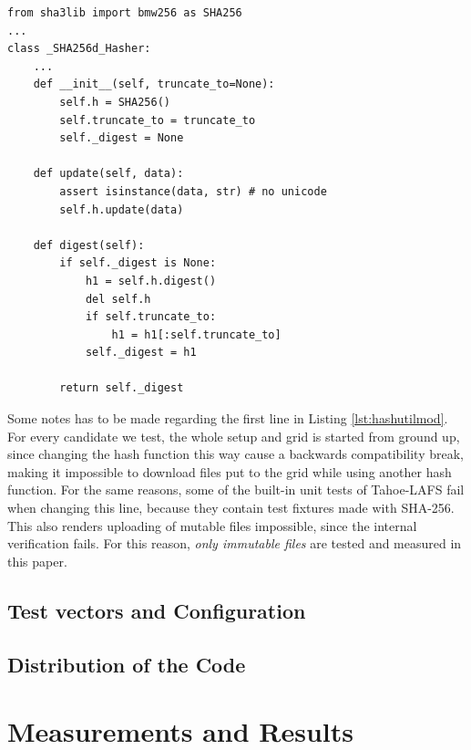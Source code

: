 \documentclass[english,12pt,a4paper]{book}
\begin{document}
\begin{lstlisting}[label=lst:hashutilmod, caption=Relevant parts of hashutil.py of Tahoe-LAFS source after modification.]
from sha3lib import bmw256 as SHA256
...
class _SHA256d_Hasher:
    ...
    def __init__(self, truncate_to=None):
        self.h = SHA256()
        self.truncate_to = truncate_to
        self._digest = None

    def update(self, data):
        assert isinstance(data, str) # no unicode
        self.h.update(data)

    def digest(self):
        if self._digest is None:
            h1 = self.h.digest()
            del self.h
            if self.truncate_to:
                h1 = h1[:self.truncate_to]
            self._digest = h1

        return self._digest
\end{lstlisting}

Some notes has to be made regarding the first line in Listing
\ref{lst:hashutilmod}. For every candidate we test, the whole setup and grid is
started from ground up, since changing the hash function this way cause a
backwards compatibility break, making it impossible to download files put to the
grid while using another hash function.
For the same reasons, some of the built-in unit tests of Tahoe-LAFS fail when
changing this line, because they contain test fixtures made with SHA-256.
This also renders uploading of mutable files impossible, since the internal
verification fails. For this reason, \emph{only immutable files} are tested and
measured in this paper.

\section{Test vectors and Configuration}


\section{Distribution of the Code}

\chapter{Measurements and Results}

\end{document}

